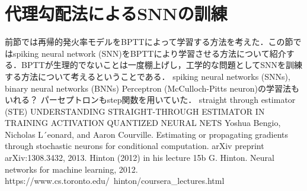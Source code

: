 \section{代理勾配法によるSNNの訓練}
前節では再帰的発火率モデルをBPTTによって学習する方法を考えた．この節ではspiking neural network (SNN)をBPTTにより学習させる方法について紹介する．BPTTが生理的でないことは一度棚上げし，工学的な問題としてSNNを訓練する方法について考えるということである．
spiking neural networks (SNNs), binary neural networks (BNNs)
Perceptron (McCulloch-Pitts neuron)の学習法もいれる？
パーセプトロンもstep関数を用いていた．
straight through estimator (STE)
UNDERSTANDING STRAIGHT-THROUGH ESTIMATOR IN TRAINING ACTIVATION QUANTIZED NEURAL NETS
Yoshua Bengio, Nicholas L´eonard, and Aaron Courville. Estimating or propagating gradients through stochastic neurons for conditional computation. arXiv preprint arXiv:1308.3432, 2013.
Hinton (2012) in his lecture 15b
G. Hinton. Neural networks for machine learning, 2012.
https://www.cs.toronto.edu/~hinton/coursera_lectures.html
